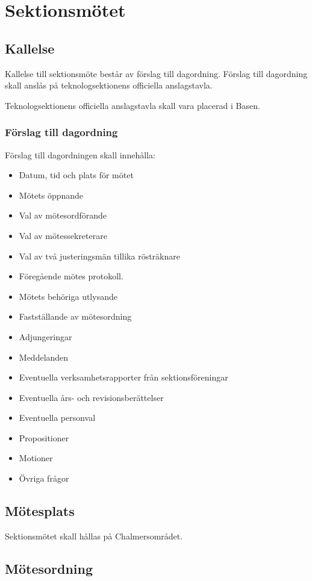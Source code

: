 \section{Sektionsmötet}

\subsection{Kallelse} 
Kallelse till sektionsmöte består av förslag till dagordning. Förslag till dagordning skall anslås på teknologsektionens officiella anslagstavla.

Teknologsektionens officiella anslagstavla skall vara placerad i Basen. 

\subsubsection{Förslag till dagordning}
Förslag till dagordningen skall innehålla:
\begin{itemize}  
  \item Datum, tid och plats för mötet 
  \item Mötets öppnande 
  \item Val av mötesordförande 
  \item Val av mötessekreterare 
  \item Val av två justeringsmän tillika rösträknare 
  \item Föregående mötes protokoll. 
  \item Mötets behöriga utlysande 
  \item Fastställande av mötesordning 
  \item Adjungeringar 
  \item Meddelanden 
  \item Eventuella verksamhetsrapporter från sektionsföreningar 
  \item Eventuella års- och revisionsberättelser 
  \item Eventuella personval 
  \item Propositioner 
  \item Motioner 
  \item Övriga frågor 
\end{itemize}
\subsection{Mötesplats} 
Sektionsmötet skall hållas på Chalmersområdet. 
\subsection{Mötesordning}
